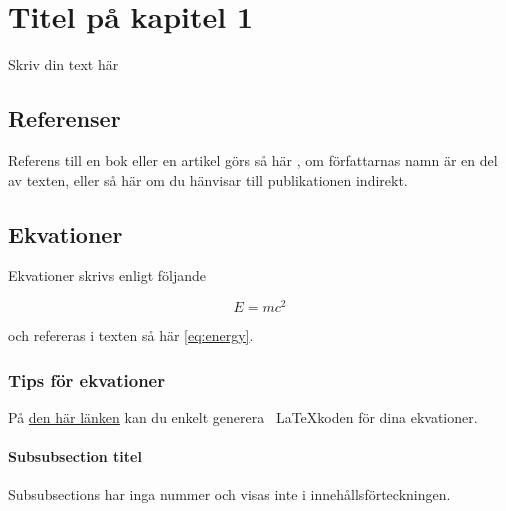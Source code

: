 \chapter{Titel på kapitel 1}

Skriv din text här

\section{Referenser}

Referens till en bok eller en artikel görs så här \citet{einstein1954ideas}, om författarnas namn är en del av texten, eller så här \citep{einstein1935can} om du hänvisar till publikationen indirekt.

\section{Ekvationer}

Ekvationer skrivs enligt följande

\begin{equation}
    E=mc^2
    \label{eq:energy}
\end{equation}

och refereras i texten så här \ref{eq:energy}.

\subsection{Tips för ekvationer}

På \href{http://www.codecogs.com/latex/eqneditor.php}{den här länken} kan du enkelt generera \ \LaTeX koden för dina ekvationer.

\subsubsection{Subsubsection titel}

Subsubsections har inga nummer och visas inte i innehållsförteckningen.